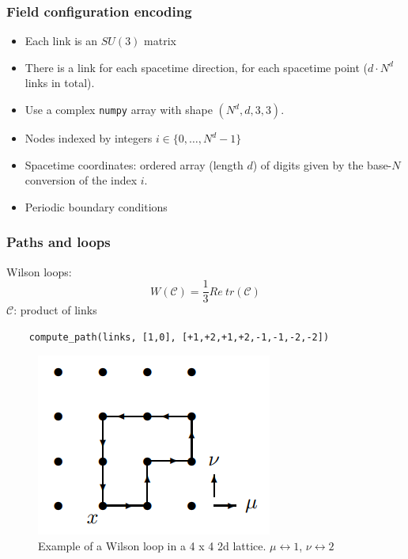 \documentclass{beamer}
\begin{document}
\begin{frame}[fragile]
    \frametitle{Field configuration encoding}
    \begin{itemize}
        \item Each link is an $SU(3)$ matrix

        \item There is a link for each spacetime direction, for each spacetime point ($d \cdot N^d$ links in total).

        \item Use a complex \texttt{numpy} array with shape $(N^d, d, 3, 3)$.

        \item Nodes indexed by integers $i \in \{0,\ldots,N^d-1\}$

        \item Spacetime coordinates: ordered array (length $d$) of digits given by the base-$N$ conversion of the index $i$.

        \item Periodic boundary conditions
    \end{itemize}
\end{frame}

\begin{frame}[fragile]
    \frametitle{Paths and loops}
    Wilson loops:
    \begin{equation*}
        W(\mathcal{C}) = \frac{1}{3} Re\ tr (\mathcal{C})
    \end{equation*}
    $\mathcal{C}$: product of links


    \begin{verbatim}
    compute_path(links, [1,0], [+1,+2,+1,+2,-1,-1,-2,-2])
    \end{verbatim}

    \begin{figure}
        \centering
        \includegraphics[width=0.3\linewidth]{wilsonloop.png}
        \caption{Example of a Wilson loop in a 4 x 4 2d lattice. $\mu \leftrightarrow 1$, $\nu \leftrightarrow 2$ }
        \label{fig:wilson-loop}
    \end{figure}

\end{frame}
\end{document}
